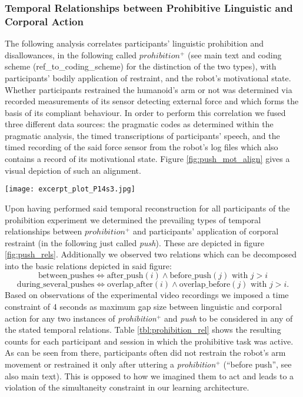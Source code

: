 \begin{screenonly}
\subsubsection{Temporal Relationships between Prohibitive Linguistic and Corporal Action}
\label{sec:temporal_rels}
The following analysis correlates participants' linguistic prohibition and disallowances, in the following called $prohibition^+$ (see main text and coding scheme
(ref\_to\_coding\_scheme) for the distinction of the two types), with participants' bodily application of restraint, and the robot's motivational state. Whether participants
restrained the humanoid's arm or not was determined via recorded measurements of its sensor detecting external force and which forms the basis of
its compliant behaviour. In order to perform this correlation we fused three different data sources: the pragmatic codes as determined within the pragmatic
analysis, the timed transcriptions of participants' speech, and the timed recording of the said force sensor from the robot's log files which also
contains a record of its motivational state. Figure \ref{fig:push_mot_align} gives a visual depiction of such an alignment.
\begin{figure*}
  \texttt{[image: excerpt\_plot\_P14s3.jpg]}
  \caption{\textbf{Excerpt of reconstructed temporal profile of human-robot interaction}: the given excerpt, taken from the reconstructed profile of P14's
    3rd session, displays  the temporal relation between \emph{prohibitive} utterances and utterances of \emph{disallowance} (top blue line), the robot's 
    sensing of pressure being applied to its arm (middle red line), and the robot's internal motivation (bottom green line).}
  \label{fig:push_mot_align}
\end{figure*}
\noindent Upon having performed said temporal reconstruction for all participants of the prohibition experiment we determined the prevailing types of temporal
relationships between $prohibition^+$ and participants' application of corporal restraint (in the following just called \emph{push}). These are depicted
in figure \ref{fig:push_rels}. Additionally we observed two relations which can be decomposed into the basic relations depicted in said figure:
$$\text{between\_pushes} \Leftrightarrow \text{after\_push}(i) \wedge \text{before\_push}(j)\text{ with }j > i$$
$$\text{during\_several\_pushes} \Leftrightarrow \text{overlap\_after}(i) \wedge \text{overlap\_before}(j) \text{ with }j > i.$$
Based on observations of the experimental video recordings we imposed a time constraint of 4 seconds as maximum gap size between
linguistic and corporal action for any two instances of \emph{prohibition}$^+$ and \emph{push} to be considered in any of the stated temporal relations.
Table \ref{tbl:prohibition_rel} shows the resulting counts for each participant and session in which the prohibitive task was active. As can be seen from
there, participants often did not restrain the robot's arm movement or restrained it only after uttering a \emph{prohibition}$^+$ (``before push'', see also main
text). This is opposed to how we imagined them to act and leads to a violation of the simultaneity constraint in our learning architecture.


\end{screenonly}
